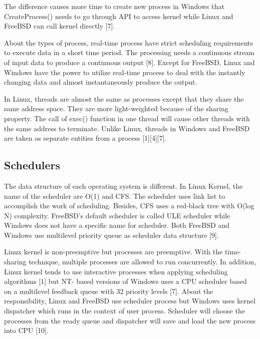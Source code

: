 \documentclass[10pt,draftclsnofoot,journal,compsoc,onecolumn]{IEEEtran}
\begin{document}
The difference causes more time to create new process in Windows that CreateProcess() needs to go through API to access kernel while Linux and FreeBSD can call kernel directly [7].

About the types of process, real-time process have strict scheduling requirements to execute data in a short time period. The processing needs a continuous stream of input data to produce a continuous output [8]. Except for FreeBSD, Linux and Windows have the power to utilize real-time process to deal with the instantly changing data and almost instantaneously produce the output.

In Linux, threads are almost the same as processes except that they share the same address space. They are more light-weighted because of the sharing property. The call of exec() function in one thread will cause other threads with the same address to terminate. Unlike Linux, threads in Windows and FreeBSD are taken as separate entities from a process [1][4][7].

\subsection{Schedulers}
The data structure of each operating system is different. In Linux Kernel, the name of the scheduler are O(1) and CFS. The scheduler uses link list to accomplish the work of scheduling. Besides, CFS uses a red-black tree with O(log N) complexity. FreeBSD’s default scheduler is called ULE scheduler while Windows does not have a specific name for scheduler. Both FreeBSD and Windows use multilevel priority queue as scheduler data structure [9].

Linux kernel is non-preemptive but processes are preemptive. With the time-sharing technique, multiple processes are allowed to run concurrently. In addition, Linux kernel tends to use interactive processes when applying scheduling algorithms [1] but NT- based versions of Windows uses a CPU scheduler based on a multilevel feedback queue with 32 priority levels [7]. About the responsibility, Linux and FreeBSD use scheduler process but Windows uses kernel dispatcher which runs in the context of user process. Scheduler will choose the processes from the ready queue and dispatcher will save and load the new process into CPU [10].  
\end{document}
